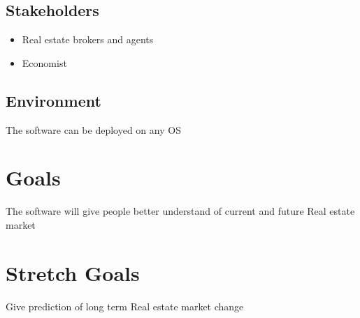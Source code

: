 \documentclass{article}
\begin{document}
\subsection{Stakeholders}
\begin{itemize}
    \item Real estate brokers and agents
    \item Economist 
\end{itemize}

\subsection{Environment}
The software can be deployed on any OS

\section{Goals}
The software will give people better understand of current and future Real estate market

\section{Stretch Goals}
Give prediction of long term Real estate market change
\end{document}
